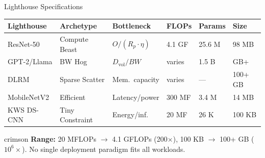 \documentclass[aspectratio=169, 12pt]{beamer}
\begin{document}
\begin{frame}{Lighthouse Specifications}
\note{
%
%
%
}

\scriptsize
\renewcommand{\arraystretch}{1.1}
\begin{tabular}{@{}llllll@{}}
  \toprule
  \textbf{Lighthouse} & \textbf{Archetype} & \textbf{Bottleneck} & \textbf{FLOPs} & \textbf{Params} & \textbf{Size} \\
  \midrule
  ResNet-50   & Compute Beast   & $O/(R_p \!\cdot\! \eta)$ & 4.1 GF & 25.6 M & 98 MB \\
  GPT-2/Llama & BW Hog          & $D_{\text{vol}}/BW$      & varies & 1.5 B  & GB+ \\
  DLRM        & Sparse Scatter  & Mem.\ capacity           & varies & ---    & 100+ GB \\
  MobileNetV2 & Efficient       & Latency/power            & 300 MF & 3.4 M  & 14 MB \\
  KWS DS-CNN  & Tiny Constraint & Energy/inf.              & 20 MF  & 26 K   & 100 KB \\
  \bottomrule
\end{tabular}

\vspace{0.15cm}
\footnotesize
\begin{mlsyscard}{crimson}
\textbf{Range:} 20 MFLOPs $\to$ 4.1 GFLOPs (200$\times$), 100 KB $\to$ 100+ GB ($10^{6}\!\times$).
No single deployment paradigm fits all workloads.
\end{mlsyscard}

\end{frame}
\end{document}
